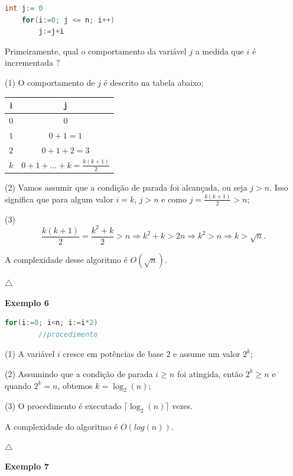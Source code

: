 \begin{lstlisting}[language=C, frame=single]
    int j:= 0
    for(i:=0; j <= n; i++)
        j:=j+i
\end{lstlisting}
Primeiramente, qual o comportamento da variável $j$ a medida que $i$ é incrementada ?

(1) O comportamento de $j$ é descrito na tabela abaixo;

\newpage
 
\begin{table}
  \centering
  \begin{tabular}{cc}
    \textbf{i} & \textbf{j} \\
    \hline
    $0$ &  $0$ \\
    $1$ &  $0+1 = 1$ \\
    $2$ & $0+1+2 = 3$ \\
    $k$ &  $0+1+...+k = \frac{k(k+1)}{2}$ \\
  \end{tabular}
\end{table}

(2) Vamos assumir que a condição de parada foi alcançada, ou seja $j>n$. Isso significa que para algum valor $i=k$, $j>n$ e como $j = \frac{k(k+1)}{2} > n$;

(3)
\[\frac{k(k+1)}{2} =  \frac{k^2+k}{2}> n \Rightarrow k^2+k > 2n \Rightarrow k^2 > n \Rightarrow k > \sqrt{n}. \]

A complexidade desse algoritmo é $O(\sqrt{n})$.

{\raggedleft $\bigtriangleup$ \par}

\textbf{Exemplo 6}

\begin{lstlisting}[language=C, frame=single]
    for(i:=0; i<n; i:=i*2)
        //procedimento
\end{lstlisting}

(1) A variável $i$ cresce em potências de base $2$ e assume um valor $2^k$;

(2) Assumindo que a condição de parada $i\geq n$ foi atingida, então $2^k \geq n$ e quando $2^k = n$, obtemos $k = \log_2(n)$;

(3) O procedimento é executado $\lceil \log_2(n) \rceil$ vezes.

A complexidade do algoritmo é $O(log(n))$.

{\raggedleft $\bigtriangleup$ \par}

\textbf{Exemplo 7}

